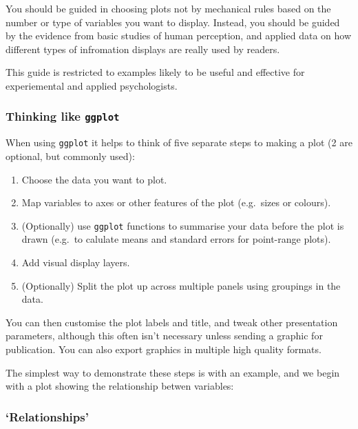 \documentclass[]{article}
\theoremstyle{definition}
\theoremstyle{definition}
\theoremstyle{definition}
\theoremstyle{remark}
\begin{document}
You should be guided in choosing plots not by mechanical rules based on
the number or type of variables you want to display. Instead, you should
be guided by the evidence from basic studies of human perception, and
applied data on how different types of infromation displays are really
used by readers.

This guide is restricted to examples likely to be useful and effective
for experiemental and applied psychologists.

\subsubsection*{\texorpdfstring{Thinking like
\texttt{ggplot}}{Thinking like ggplot}}\label{thinking-like-ggplot}

When using \texttt{ggplot} it helps to think of five separate steps to
making a plot (2 are optional, but commonly used):

\begin{enumerate}
\def\labelenumi{\arabic{enumi}.}
\item
  Choose the data you want to plot.
\item
  Map variables to axes or other features of the plot (e.g.~sizes or
  colours).
\item
  (Optionally) use \texttt{ggplot} functions to summarise your data
  before the plot is drawn (e.g.~to calulate means and standard errors
  for point-range plots).
\item
  Add visual display layers.
\item
  (Optionally) Split the plot up across multiple panels using groupings
  in the data.
\end{enumerate}

You can then customise the plot labels and title, and tweak other
presentation parameters, although this often isn't necessary unless
sending a graphic for publication. You can also export graphics in
multiple high quality formats.

The simplest way to demonstrate these steps is with an example, and we
begin with a plot showing the relationship betwen variables:

\subsubsection*{\texorpdfstring{`Relationships'}{Relationships}}\label{relationships}
\end{document}
